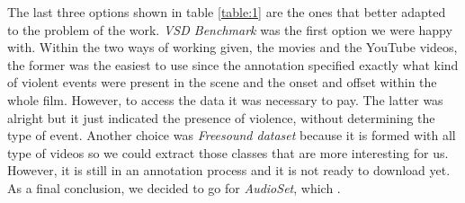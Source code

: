 	The last three options shown in table \ref{table:1} are the ones that better adapted to the problem of the work. \textit{VSD Benchmark} was the first option we were happy with. Within the two ways of working given, the movies and the YouTube videos, the former was the easiest to use since the annotation specified exactly what kind of violent events were present in the scene and the onset and offset within the whole film. However, to access the data it was necessary to pay. The latter was alright but it just indicated the presence of violence, without determining the type of event. Another choice was \textit{Freesound dataset} because it is formed with all type of videos so we could extract those classes that are more interesting for us. However, it is still in an annotation process and it is not ready to download yet. As a final conclusion, we decided to go for \textit{AudioSet}, which .
	
	
